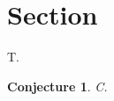 \documentclass{article}
\newtheorem{conjecture}[theorem]{Conjecture}
\begin{document}
\section{Section}

\begin{theorem} T. \end{theorem}
\begin{conjecture} C. \end{conjecture}
\end{document}
